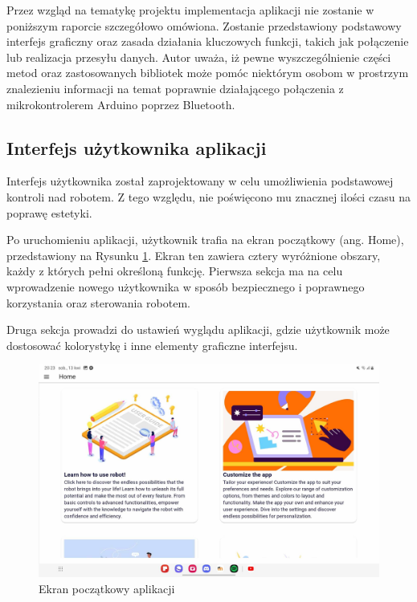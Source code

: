 \documentclass{report}
\begin{document}
Przez wzgląd na tematykę projektu implementacja aplikacji nie zostanie w poniższym raporcie szczegółowo omówiona. Zostanie przedstawiony podstawowy interfejs graficzny oraz zasada działania kluczowych funkcji, takich jak połączenie lub realizacja przesyłu danych. Autor uważa, iż pewne wyszczególnienie części metod oraz zastosowanych bibliotek może pomóc niektórym osobom w prostrzym znalezieniu informacji na temat poprawnie działającego połączenia z mikrokontrolerem Arduino poprzez Bluetooth.

\subsection{\large Interfejs użytkownika aplikacji }
%
%

Interfejs użytkownika został zaprojektowany w celu umożliwienia podstawowej kontroli nad robotem. Z tego względu, nie poświęcono mu znacznej ilości czasu na poprawę estetyki.

Po uruchomieniu aplikacji, użytkownik trafia na ekran początkowy (ang. Home), przedstawiony na Rysunku \ref{fig:home_screen}. Ekran ten zawiera cztery wyróżnione obszary, każdy z których pełni określoną funkcję. Pierwsza sekcja ma na celu wprowadzenie nowego użytkownika w sposób bezpiecznego i poprawnego korzystania oraz sterowania robotem.

Druga sekcja prowadzi do ustawień wyglądu aplikacji, gdzie użytkownik może dostosować kolorystykę i inne elementy graficzne interfejsu.

\begin{figure}[H]
    \centering
    \includegraphics[width=1.0\textwidth]{src/app/home.jpg}
    \caption{Ekran początkowy aplikacji}
    \label{fig:home_screen}
\end{figure}
\end{document}
